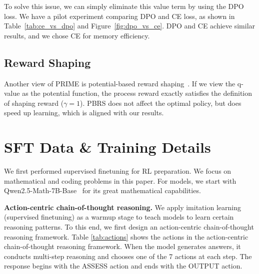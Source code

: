 To solve this issue, we can simply eliminate this value term by using the DPO loss. We have a pilot experiment comparing DPO and CE loss, as shown in Table~\ref{tab:ce_vs_dpo} and Figure~\ref{fig:dpo_vs_ce}. DPO and CE achieve similar results, and we chose CE for memory efficiency.






\subsection{Reward Shaping}
Another view of PRIME is potential-based reward shaping~\citep{DBLP:conf/icml/NgHR99}. If we view the q-value as the potential function, the process reward exactly satisfies the definition of shaping reward ($\gamma=1$). PBRS does not affect the optimal policy, but does speed up learning, which is aligned with our results.

\section{SFT Data \& Training Details}
\label{sec:sft_data_training_details}


We first performed supervised finetuning for RL preparation. We focus on mathematical and coding problems in this paper. For models, we start with Qwen2.5-Math-7B-Base~\citep{yang2024qwen25mathtechnicalreportmathematical} for its great mathematical capabilities. 



\textbf{Action-centric chain-of-thought reasoning.} We apply imitation learning (supervised finetuning) as a warmup stage to teach models to learn certain reasoning patterns. To this end, we first design an action-centric chain-of-thought reasoning framework.
Table \ref{tab:actions} shows the actions in the action-centric chain-of-thought reasoning framework. When the model generates answers, it conducts multi-step reasoning and chooses one of the 7 actions at each step. The response begins with the ASSESS action and ends with the OUTPUT action.

